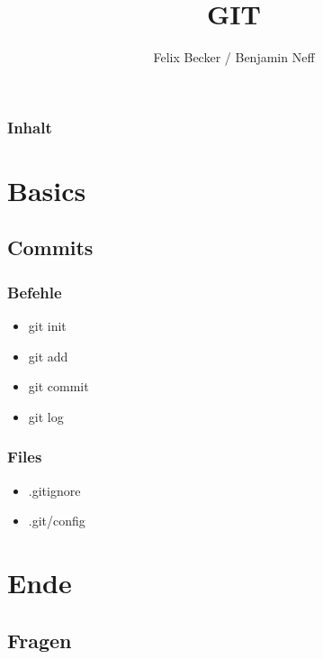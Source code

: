 \documentclass{beamer}
\title{GIT}
\subtitle{}
\institute[Tondorf]{Tondorf 2012}
\author[F. Becker/B. Neff]{
	Felix Becker / Benjamin Neff
}
\begin{document}
	\begin{frame}
		\titlepage
	\end{frame}

	\begin{frame}
		\frametitle{Inhalt}
		\setcounter{tocdepth}{1}
		\tableofcontents
	\end{frame}
	
	\section{Basics}
	
		\subsection{Commits}
			
			\begin{frame}
				\frametitle{Befehle}
				
				\begin{itemize}
					\item{git init}
					\item{git add}
					\item{git commit}
					\item{git log}
				\end{itemize}
			\end{frame}

			\begin{frame}
				\frametitle{Files}
				
				\begin{itemize}
					\item{.gitignore}
					\item{.git/config}
				\end{itemize}
			\end{frame}


	\section{Ende}
		\subsection{Fragen}
\end{document}

